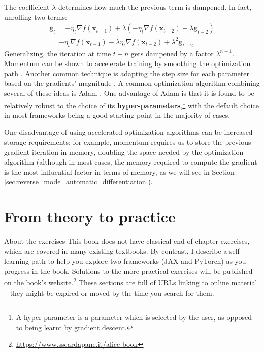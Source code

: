 The coefficient $\lambda$ determines how much the previous term is dampened. In fact, unrolling two terms:
%
\begin{gather*}
\mathbf{g}_t=-\eta_t\nabla f(\mathbf{x}_{t-1}) +\lambda(-\eta_t\nabla f(\mathbf{x}_{t-2}) +\lambda\mathbf{g}_{t-2}) \\ = -\eta_t\nabla f(\mathbf{x}_{t-1}) -\lambda\eta_t\nabla f(\mathbf{x}_{t-2}) +\lambda^2\mathbf{g}_{t-2}
\end{gather*}
%
Generalizing, the iteration at time $t-n$ gets dampened by a factor $\lambda^{n-1}$. Momentum can be shown to accelerate training by smoothing the optimization path \cite{sutskever2013importance}. Another common technique is adapting the step size for each parameter based on the gradients’ magnitude \cite{zhang2023dive}. A common optimization algorithm combining several of these ideas is Adam \cite{kingma2014adam}. One advantage of Adam is that it is found to be relatively robust to the choice of its \textbf{hyper-parameters},\footnote{A hyper-parameter is a parameter which is selected by the user, as opposed to being learnt by gradient descent.} with the default choice in most frameworks being a good starting point in the majority of cases.

One disadvantage of using accelerated optimization algorithms can be increased storage requirements: for example, momentum requires us to store the previous gradient iteration in memory, doubling the space needed by the optimization algorithm (although in most cases, the memory required to compute the gradient is the most influential factor in terms of memory, as we will see in Section \ref{sec:reverse_mode_automatic_differentiation}).

\newpage
\section*{From theory to practice}

\begin{supportbox}{About the exercises}
This book does not have classical end-of-chapter exercises, which are covered in many existing textbooks. By contrast, I describe a self-learning path to help you explore two frameworks (JAX and PyTorch) as you progress in the book. Solutions to the more practical exercises will be published on the book's website.\footnote{\url{https://www.sscardapane.it/alice-book}} These sections are full of URLs linking to online material -- they might be expired or moved by the time you search for them.
\end{supportbox}

